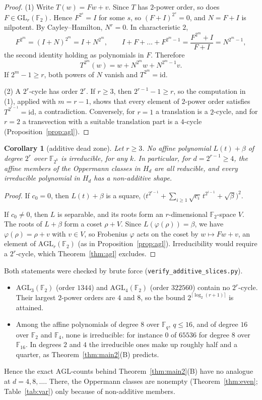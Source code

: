 \documentclass[11pt,a4paper]{amsart}
\newtheorem{corollary}[theorem]{Corollary}
\theoremstyle{definition}
\theoremstyle{remark}
\newcommand{\F}{\mathbb{F}}
\begin{document}
\begin{proof}
(1) Write $T(w)=Fw+v$. Since $T$ has $2$-power order, so does $F\in\mathrm{GL}_r(\F_2)$. Hence $F^{2^s}=I$ for some
$s$, so $(F+I)^{2^s}=0$, and $N=F+I$ is nilpotent. By Cayley--Hamilton, $N^r=0$. In characteristic $2$,
\[
F^{2^m}=(I+N)^{2^m}=I+N^{2^m},\qquad I+F+\dots+F^{2^m-1}=\frac{F^{2^m}+I}{F+I}=N^{2^m-1},
\]
the second identity holding as polynomials in $F$. Therefore
\[
T^{2^m}(w)=w+N^{2^m}w+N^{2^m-1}v .
\]
If $2^m-1\ge r$, both powers of $N$ vanish and $T^{2^m}=\mathrm{id}$.

(2) A $2^r$-cycle has order $2^r$. If $r\ge3$, then $2^{r-1}-1\ge r$, so the computation in (1), applied with $m=r-1$, shows that every
element of $2$-power order satisfies $T^{2^{r-1}}=\mathrm{id}$, a contradiction. Conversely, for $r=1$ a translation is a
$2$-cycle, and for $r=2$ a transvection with a suitable translation part is a $4$-cycle (Proposition~\ref{prop:agl}).
\end{proof}

\begin{corollary}[additive dead zone]\label{cor:dead}
Let $r\ge3$. No affine polynomial $L(t)+\beta$ of degree $2^r$ over $\F_{2^k}$ is irreducible, for any $k$. In
particular, for $d=2^{r-1}\ge4$, the affine members of the Oppermann classes in $H_d$ are all reducible, and every
irreducible polynomial in $H_d$ has a non-additive shape.
\end{corollary}

\begin{proof}
If $c_0=0$, then $L(t)+\beta$ is a square, $\bigl(t^{2^{r-1}}+\sum_{i\ge1}\sqrt{c_i}\,t^{2^{i-1}}+\sqrt\beta\bigr)^2$.

If $c_0\ne0$, then $L$ is separable, and its roots form an $r$-dimensional $\F_2$-space $V$. The roots of
$L+\beta$ form a coset $\rho+V$. Since $L(\varphi(\rho))=\beta$, we have $\varphi(\rho)=\rho+v$ with $v\in V$, so
Frobenius $\varphi$ acts on the coset by $w\mapsto Fw+v$, an element of $\mathrm{AGL}_r(\F_2)$ (as in
Proposition~\ref{prop:agl}). Irreducibility would require a $2^r$-cycle, which Theorem~\ref{thm:agl} excludes.
\end{proof}

Both statements were checked by brute force (\texttt{verify\_additive\_slices.py}).
\begin{itemize}
\item $\mathrm{AGL}_3(\F_2)$ (order $1344$) and $\mathrm{AGL}_4(\F_2)$ (order $322560$) contain no $2^r$-cycle. Their
largest $2$-power orders are $4$ and $8$, so the bound $2^{\lceil\log_2(r+1)\rceil}$ is attained.
\item Among the affine polynomials of degree $8$ over $\F_q$, $q\le16$, and of degree $16$ over $\F_2$ and $\F_4$,
none is irreducible: for instance $0$ of $65536$ for degree $8$ over $\F_{16}$. In degrees $2$ and $4$ the
irreducible ones make up roughly half and a quarter, as Theorem~\ref{thm:main2}(B) predicts.
\end{itemize}
Hence the exact $\mathrm{AGL}$-counts behind Theorem~\ref{thm:main2}(B) have no analogue at $d=4,8,\dots$.
There, the Oppermann classes are nonempty (Theorem~\ref{thm:even}; Table~\ref{tab:var}) only because of
non-additive members.
\end{document}
